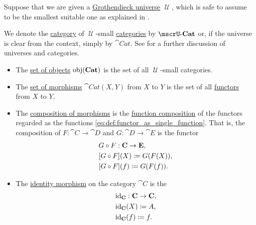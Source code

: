 \begin{definition}\label{def:category_of_small_categories}
  Suppose that we are given a \hyperref[def:grothendieck_universe]{Grothendieck universe} \( \mscrU \), which is safe to assume to be the smallest suitable one as explained in .

  We denote the \hyperref[def:category]{category} of \( \mscrU \)-small \hyperref[def:category]{categories} by \( \ucat{Cat} \) or, if the universe is clear from the context, simply by \( \cat{Cat} \). See  for a further discussion of universes and categories.

  \begin{itemize}
    \item The \hyperref[def:category/objects]{set of objects} \( \operatorname{obj}(\operatorname{\mathbf{Cat}}) \) is the set of all \( \mscrU \)-small categories.

    \item The \hyperref[def:category/morphisms]{set of morphisms} \( \cat{Cat}(X, Y) \) from \( X \) to \( Y \) is the set of all \hyperref[def:functor]{functors} from \( X \) to \( Y \).

    \item The \hyperref[def:category/composition]{composition of morphisms} is the \hyperref[def:multi_valued_function/composition]{function composition} of the functors regarded as the functions \eqref{eq:def:functor_as_single_function}. That is, the composition of \( F: \cat{C} \to \cat{D} \) and \( G: \cat{D} \to \cat{E} \) is the functor
    \begin{equation}\label{eq:def:category_of_small_categories/composition}
      \begin{aligned}
        &G \bincirc F: \cat{C} \to \cat{E}, \\
        &[G \bincirc F](X) \coloneqq G(F(X)), \\
        &[G \bincirc F](f) \coloneqq G(F(f)).
      \end{aligned}
    \end{equation}

    \item The \hyperref[def:category/identity]{identity morphism} on the category \( \cat{C} \) is the 
    \begin{equation}\label{eq:def:category_of_small_categories/identity}
      \begin{aligned}
        &\operatorname{id}_{\operatorname{\mathbf{C}}}: \operatorname{\mathbf{C}} \to \operatorname{\mathbf{C}}, \\
        &\operatorname{id}_{\operatorname{\mathbf{C}}}(X) \coloneqq A, \\
        &\operatorname{id}_{\operatorname{\mathbf{C}}}(f) \coloneqq f.
      \end{aligned}
    \end{equation}
  \end{itemize}
\end{definition}
